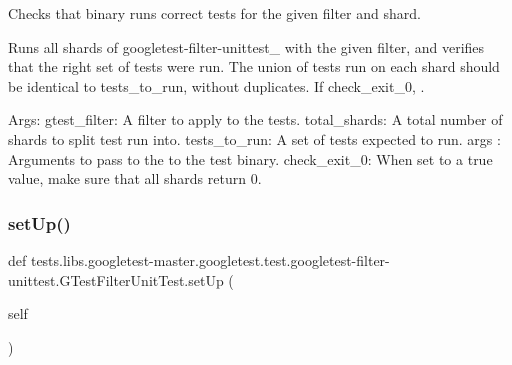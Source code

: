 \begin{DoxyVerb}Checks that binary runs correct tests for the given filter and shard.

Runs all shards of googletest-filter-unittest_ with the given filter, and
verifies that the right set of tests were run. The union of tests run
on each shard should be identical to tests_to_run, without duplicates.
If check_exit_0, .

Args:
  gtest_filter: A filter to apply to the tests.
  total_shards: A total number of shards to split test run into.
  tests_to_run: A set of tests expected to run.
  args   :      Arguments to pass to the to the test binary.
  check_exit_0: When set to a true value, make sure that all shards
            return 0.
\end{DoxyVerb}
 \mbox{\label{classtests_1_1libs_1_1googletest-master_1_1googletest_1_1test_1_1googletest-filter-unittest_1_1GTestFilterUnitTest_a298b2fdd3d7c6ead66337f42c69790a9}} 
\subsubsection{\texorpdfstring{set\+Up()}{setUp()}}
{\footnotesize\ttfamily def tests.\+libs.\+googletest-\/master.\+googletest.\+test.\+googletest-\/filter-\/unittest.\+G\+Test\+Filter\+Unit\+Test.\+set\+Up (\begin{DoxyParamCaption}\item[{}]{self }\end{DoxyParamCaption})}

